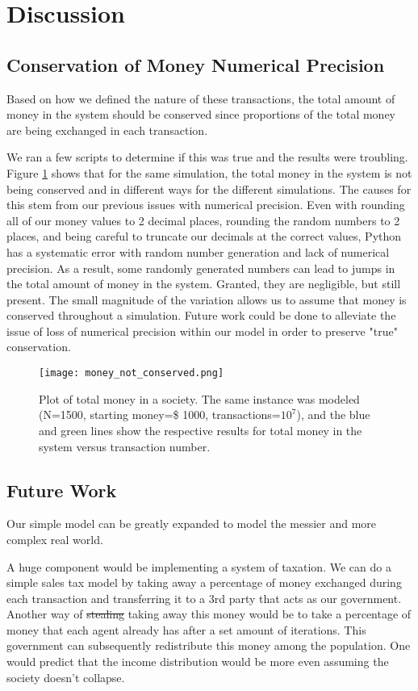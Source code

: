 \documentclass[11pt]{article}
\begin{document}
\section{Discussion}
\subsection{Conservation of Money Numerical Precision} \label{conservation}
Based on how we defined the nature of these transactions, the total amount of money in the system should be conserved since proportions of the total money are being exchanged in each transaction. 

We ran a few scripts to determine if this was true and the results were troubling. Figure \ref{shit} shows that for the same simulation, the total money in the system is not being conserved and in different ways for the different simulations. The causes for this stem from our previous issues with numerical precision. Even with rounding all of our money values to 2 decimal places, rounding the random numbers to 2 places, and being careful to truncate our decimals at the correct values, Python has a systematic error with random number generation and lack of numerical precision. As a result, some randomly generated numbers can lead to jumps in the total amount of money in the system. Granted, they are negligible, but still present. The small magnitude of the variation allows us to assume that money is conserved throughout a simulation. Future work could be done to alleviate the issue of loss of numerical precision within our model in order to preserve "true" conservation. 

\begin{figure}[!ht]
	\centering
	\texttt{[image: money\_not\_conserved.png]}
	\caption{Plot of total money in a society. The same instance was modeled (N=1500, starting money=\$ 1000, transactions=$10^7$), and the blue and green lines show the respective results for total money in the system versus transaction number.}
	\label{shit}
\end{figure}

\subsection{Future Work}
Our simple model can be greatly expanded to model the messier and more complex real world.

A huge component would be implementing a system of taxation. We can do a simple sales tax model by taking away a percentage of money exchanged during each transaction and transferring it to a 3rd party that acts as our government. Another way of \sout{stealing} taking away this money would be to take a percentage of money that each agent already has after a set amount of iterations. This government can subsequently redistribute this money among the population. One would predict that the income distribution would be more even assuming the society doesn't collapse.
\end{document}
